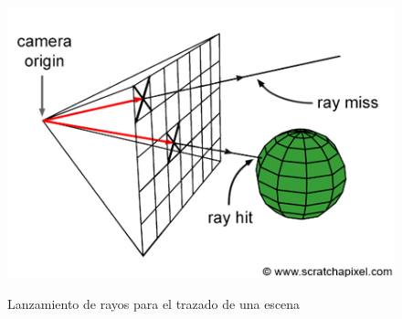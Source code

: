 \begin{figure}[H]
  \centering
  \captionsetup{justification=centering}
  \includegraphics[width=1.0\textwidth]{secciones/imagenes/starting/gpu.png}\label{fig:marcher}
  \caption{Lanzamiento de rayos para el trazado de una escena}
\end{figure}


